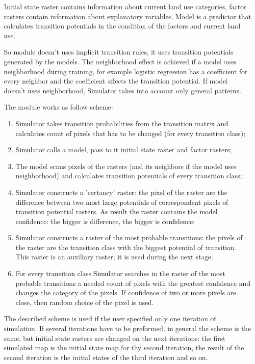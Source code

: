 \documentclass{report}
\begin{document}
Initial state raster contains information about current land use categories, factor rasters contain information about explanatory variables. Model is a predictor that calculates transition potentials in the condition of the factors and current land use.

So module doesn't uses implicit transition rules, it uses transition potentials generated by the models. The neighborhood effect is achieved if a model uses neighborhood during training, for example logistic regression has a coefficient for every neighbor and the coefficient affects the transition potential. If model doesn't uses neighborhood, Simulator takes into account only general patterns. 

The module works as follow scheme:
\begin{enumerate}
    \item Simulator takes transition probabilities from the transition matrix and calculates count of pixels that has to be changed (for every transition class);
    \item Simulator calls a model, pass to it initial state raster and factor rasters;
    \item The model scans pixels of the rasters (and its neighbors if the model uses neighborhood) and calculates transition potentials of every transition class;
    \item Simulator constructs a 'certancy' raster: the pixel of the raster are the difference between two most large potentials of correspondent pixels of transition potential rasters. As result the raster contains the model confidence: the bigger is difference, the bigger is confidence;
    \item Simulator constructs a raster of the most probable transitions: the pixels of the raster are the transition class with the biggest potential of transition. This raster is an auxiliary raster; it is used during the next stage;
    \item For every transition class Simulator searches in the raster of the most probable transitions a needed count of pixels with the greatest confidence and changes the category of the pixels. If confidence of two or more pixels are close, then random choice of the pixel is used.
\end{enumerate}

The described scheme is used if the user specified only one iteration of simulation. If several iterations have to be preformed, in general the scheme is the same, but initial state rasters are changed on the next iterations: the first simulated map is the initial state map for thy second iteration, the result of the second iteration is the initial states of the third iteration and so on. 
\end{document}
